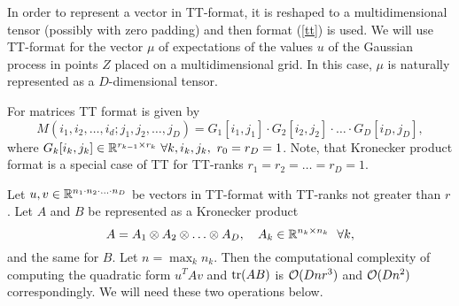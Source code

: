   In order to represent a vector in TT-format, it is reshaped to a multidimensional
  tensor (possibly with zero padding) and then format (\ref{tt}) is used. We will
  use TT-format for the vector $\mu$ of expectations of the values $u$ of the
  Gaussian process in points $Z$ placed on a multidimensional grid. In this case,
  $\mu$ is naturally represented as a $D$-dimensional tensor.

  For matrices TT format is given by
  \[
    M(i_1, i_2, \ldots, i_d; j_1, j_2, \ldots, j_D) = G_1 [i_1, j_1] \cdot
    G_2[i_2, j_2] \cdot \ldots \cdot G_D[i_D, j_D],
  \]
  where $G_k[i_k, j_k] \in \mathbb{R}^{r_{k-1}\times r_{k}}\ \forall k, i_k, j_k,\ r_0 = r_{D} = 1$. Note, that Kronecker product format is a special case of TT for TT-ranks
  $r_1 = r_2 = \ldots = r_{D} = 1$.

  Let $u, v \in \mathbb{R}^{n_1 \cdot n_2 \cdot \ldots \cdot n_D}$ be vectors
  in TT-format with TT-ranks not greater than $r$. Let $A$ and $B$ be represented as a Kronecker product
  \[
    A = A_1 \otimes A_2 \otimes \ldots \otimes A_D,~~~A_k \in \mathbb{R}^{n_k \times n_k}~~\forall k,
  \]
  and the same for $B$. Let $n = \max_k n_k$. Then the computational complexity
  of computing the quadratic form $u^T A v$ and $\mbox{tr}(AB)$ is $\mathcal{O}(Dnr^3)$ and $\mathcal{O}(Dn^2)$ correspondingly. We will need these two
  operations below.
